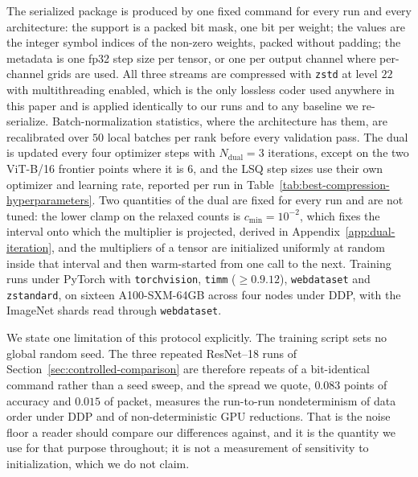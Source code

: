 \documentclass{article}
\begin{document}
The serialized package is produced by one fixed command for every run and every
architecture: the support is a packed bit mask, one bit per weight; the values
are the integer symbol indices of the non-zero weights, packed without padding;
the metadata is one fp32 step size per tensor, or one per output channel where
per-channel grids are used. All three streams are compressed with
\texttt{zstd} at level $22$ with multithreading enabled, which is the only
lossless coder used anywhere in this paper and is applied identically to our
runs and to any baseline we re-serialize. Batch-normalization statistics, where
the architecture has them, are recalibrated over $50$ local batches per rank
before every validation pass. The dual is updated every four optimizer steps with
$N_{\mathrm{dual}}=3$ iterations, except on the two ViT-B/16 frontier points where
it is $6$, and the LSQ step sizes use their own optimizer and learning rate,
reported per run in Table~\ref{tab:best-compression-hyperparameters}. Two
quantities of the dual are fixed for every run and are not tuned: the lower clamp
on the relaxed counts is $c_{\min}=10^{-2}$, which fixes the interval onto which
the multiplier is projected, derived in Appendix~\ref{app:dual-iteration}, and the multipliers of a tensor are initialized uniformly at random
inside that interval and then warm-started from one call to the next.
Training runs under PyTorch with \texttt{torchvision}, \texttt{timm}
($\geq0.9.12$), \texttt{webdataset} and \texttt{zstandard}, on sixteen
A100-SXM-64GB across four nodes under DDP, with the ImageNet shards read through
\texttt{webdataset}.

We state one limitation of this protocol explicitly. The training script sets no
global random seed. The three repeated ResNet--18 runs of
Section~\ref{sec:controlled-comparison} are therefore repeats of a
bit-identical command rather than a seed sweep, and the spread we quote,
$0.083$ points of accuracy and $0.015$ of packet, measures the run-to-run
nondeterminism of data order under DDP and of non-deterministic GPU reductions.
That is the noise floor a reader should compare our differences against, and it
is the quantity we use for that purpose throughout; it is not a measurement of
sensitivity to initialization, which we do not claim.
\end{document}
